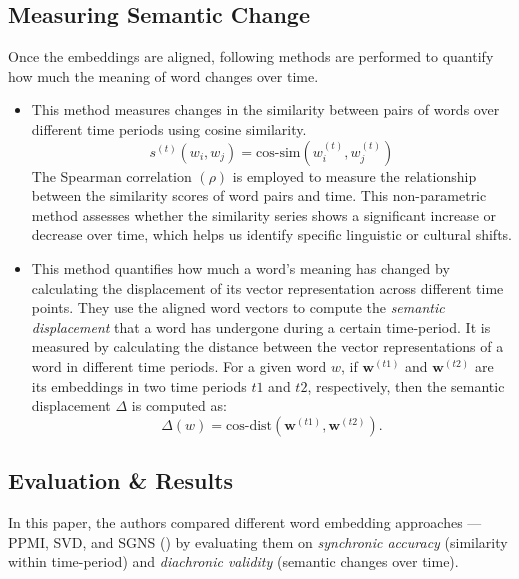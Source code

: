 \subsection{Measuring Semantic Change}\label{subsec:measuring-semantic-change}
Once the embeddings are aligned, following methods are performed to quantify how much the meaning of word changes over time.
\begin{itemize}
    \item {}
        This method measures changes in the similarity between pairs of words over different time periods using cosine similarity.
        \begin{equation}
            s^{(t)}(w_i, w_j) = \text{cos-sim}(w_i^{(t)}, w_j^{(t)})
            \label{eq:equation2}
        \end{equation}
        The Spearman correlation $(\rho)$ is employed to measure the relationship between the similarity scores of word pairs and time.
        This non-parametric method assesses whether the similarity series shows a significant increase or decrease over time, which helps us identify specific linguistic or cultural shifts.

    \item {}
        This method quantifies how much a word's meaning has changed by calculating the displacement of its vector representation across different time points.
        They use the aligned word vectors to compute the \emph{semantic displacement} that a word has undergone during a certain time-period.
        It is measured by calculating the distance between the vector representations of a word in different time periods.
        For a given word $w$, if $\mathbf{w}^{(t1)}$ and $\mathbf{w}^{(t2)}$ are its embeddings in two time periods $t1$ and $t2$, respectively, then the semantic displacement $\Delta$ is computed as:
        \begin{equation}
            \Delta(w) = \text{cos-dist}(\mathbf{w}^{(t1)}, \mathbf{w}^{(t2)}).\label{eq:equation3}
        \end{equation}
\end{itemize}

\subsection{Evaluation \& Results}\label{subsec:evaluation&results}
In this paper, the authors compared different word embedding approaches — PPMI, SVD, and SGNS () by evaluating them
on \emph{synchronic accuracy} (similarity within time-period) and \emph{diachronic validity} (semantic changes over time).

